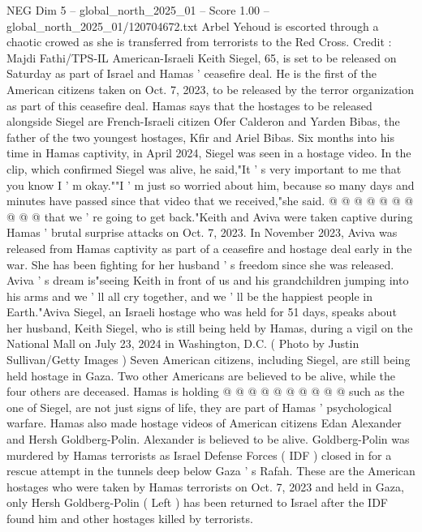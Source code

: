 \begin{textsample}{NEG Dim 5 – global\_north\_2025\_01 – Score 1.00 – global\_north\_2025\_01/120704672.txt}  \label{ex:f5_neg_188}
Arbel Yehoud is escorted through a chaotic crowed as she is transferred from terrorists to the Red Cross.
Credit : Majdi Fathi/TPS-IL American-Israeli Keith Siegel, 65, is set to be released on Saturday as part of Israel and Hamas ' ceasefire deal.
He is the first of the American citizens taken on Oct. 7, 2023, to be released by the terror organization as part of this ceasefire deal.
Hamas says that the hostages to be released alongside Siegel are French-Israeli citizen Ofer Calderon and Yarden Bibas, the father of the two youngest hostages, Kfir and Ariel Bibas.
Six months into his time in Hamas captivity, in April 2024, Siegel was seen in a hostage video.
In the clip, which confirmed Siegel was alive, he said,"It ' s very important to me that you know I ' m okay.""I ' m just so worried about him, because so many days and minutes have passed since that video that we received,"she said. @ @ @ @ @ @ @ @ @ @ that we ' re going to get back."Keith and Aviva were taken captive during Hamas ' brutal surprise attacks on Oct. 7, 2023.
In November 2023, Aviva was released from Hamas captivity as part of a ceasefire and hostage deal early in the war.
She has been fighting for her husband ' s freedom since she was released.
Aviva ' s dream is"seeing Keith in front of us and his grandchildren jumping into his arms and we ' ll all cry together, and we ' ll be the happiest people in Earth."Aviva Siegel, an Israeli hostage who was held for 51 days, speaks about her husband, Keith Siegel, who is still being held by Hamas, during a vigil on the National Mall on July 23, 2024 in Washington, D.C. ( Photo by Justin Sullivan/Getty Images ) Seven American citizens, including Siegel, are still being held hostage in Gaza.
Two other Americans are believed to be alive, while the four others are deceased.
Hamas is holding @ @ @ @ @ @ @ @ @ @ such as the one of Siegel, are not just signs of life, they are part of Hamas ' psychological warfare.
Hamas also made hostage videos of American citizens Edan Alexander and Hersh Goldberg-Polin.
Alexander is believed to be alive.
Goldberg-Polin was murdered by Hamas terrorists as Israel Defense Forces ( IDF ) closed in for a rescue attempt in the tunnels deep below Gaza ' s Rafah.
These are the American hostages who were taken by Hamas terrorists on Oct. 7, 2023 and held in Gaza, only Hersh Goldberg-Polin ( Left ) has been returned to Israel after the IDF found him and other hostages killed by terrorists.

\end{textsample}
